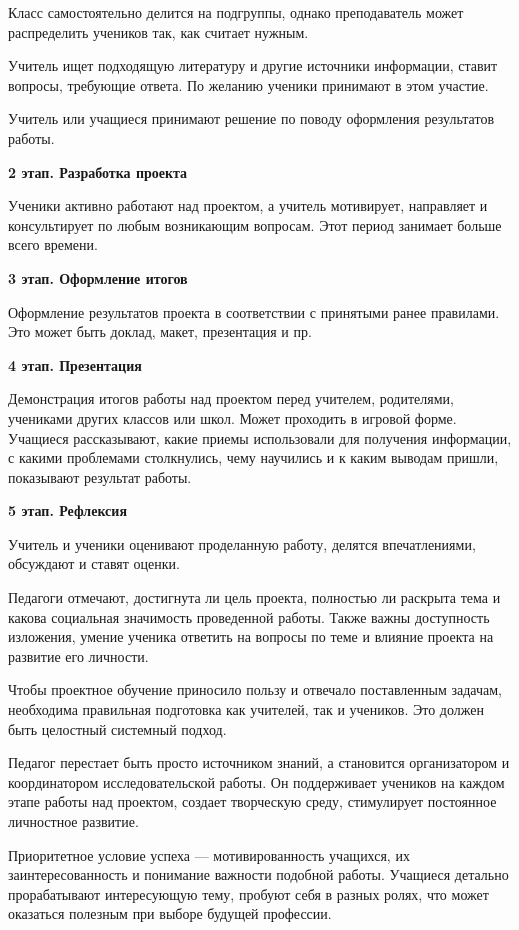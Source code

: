 \documentclass[a4paper, 12pt]{extarticle}
\begin{document}
Класс самостоятельно делится на подгруппы, однако преподаватель может распределить учеников так, как считает нужным.

Учитель ищет подходящую литературу и другие источники информации, ставит вопросы, требующие ответа. По желанию ученики принимают в этом участие.

Учитель или учащиеся принимают решение по поводу оформления результатов работы.

\textbf{2 этап. Разработка проекта}

Ученики активно работают над проектом, а учитель мотивирует, направляет и консультирует по любым возникающим вопросам. Этот период занимает больше всего времени.

\textbf{3 этап. Оформление итогов}

Оформление результатов проекта в соответствии с принятыми ранее правилами. Это может быть доклад, макет, презентация и пр.

\textbf{4 этап. Презентация}

Демонстрация итогов работы над проектом перед учителем, родителями, учениками других классов или школ. Может проходить в игровой форме. Учащиеся рассказывают, какие приемы использовали для получения информации, с какими проблемами столкнулись, чему научились и к каким выводам пришли, показывают результат работы.

\textbf{5 этап. Рефлексия}

Учитель и ученики оценивают проделанную работу, делятся впечатлениями, обсуждают и ставят оценки.

Педагоги отмечают, достигнута ли цель проекта, полностью ли раскрыта тема и какова социальная значимость проведенной работы. Также важны доступность изложения, умение ученика ответить на вопросы по теме и влияние проекта на развитие его личности.

Чтобы проектное обучение приносило пользу и отвечало поставленным задачам, необходима правильная подготовка как учителей, так и учеников. Это должен быть целостный системный подход.

Педагог перестает быть просто источником знаний, а становится организатором и координатором исследовательской работы. Он поддерживает учеников на каждом этапе работы над проектом, создает творческую среду, стимулирует постоянное личностное развитие.

Приоритетное условие успеха — мотивированность учащихся, их заинтересованность и понимание важности подобной работы. Учащиеся детально прорабатывают интересующую тему, пробуют себя в разных ролях, что может оказаться полезным при выборе будущей профессии.
\end{document}
